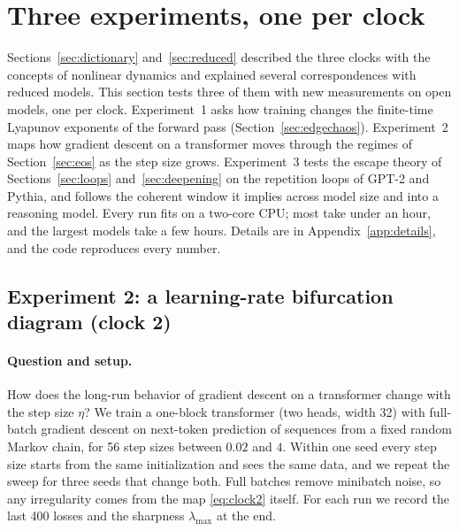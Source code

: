 \section{Three experiments, one per clock}
\label{sec:experiments}

Sections~\ref{sec:dictionary} and~\ref{sec:reduced} described the three clocks with the concepts of nonlinear dynamics and explained several correspondences with reduced models. This section tests three of them with new measurements on open models, one per clock. Experiment~1 asks how training changes the finite-time Lyapunov exponents of the forward pass (Section~\ref{sec:edgechaos}). Experiment~2 maps how gradient descent on a transformer moves through the regimes of Section~\ref{sec:eos} as the step size grows. Experiment~3 tests the escape theory of Sections~\ref{sec:loops} and~\ref{sec:deepening} on the repetition loops of GPT-2 and Pythia, and follows the coherent window it implies across model size and into a reasoning model. Every run fits on a two-core CPU; most take under an hour, and the largest models take a few hours. Details are in Appendix~\ref{app:details}, and the code reproduces every number.



\subsection{Experiment 2: a learning-rate bifurcation diagram (clock 2)}
\label{sec:exp2}

\paragraph{Question and setup.} How does the long-run behavior of gradient descent on a transformer change with the step size $\eta$? We train a one-block transformer (two heads, width 32) with full-batch gradient descent on next-token prediction of sequences from a fixed random Markov chain, for 56 step sizes between $0.02$ and $4$. Within one seed every step size starts from the same initialization and sees the same data, and we repeat the sweep for three seeds that change both. Full batches remove minibatch noise, so any irregularity comes from the map \eqref{eq:clock2} itself. For each run we record the last 400 losses and the sharpness $\lambda_{\max}$ at the end.

